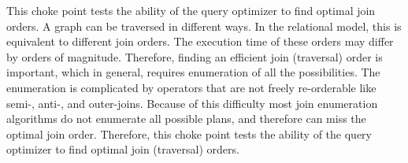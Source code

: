 
This choke point tests the ability of the query optimizer to find optimal join
orders. A graph can be traversed in different ways. In the relational model,
this is equivalent to different join orders. The execution time of these orders
may differ by orders of magnitude. Therefore, finding an efficient join
(traversal) order is important, which in general, requires enumeration of all
the possibilities. The enumeration is complicated by operators that are not
freely re-orderable like semi-, \mbox{anti-,} and outer-joins. Because of this
difficulty most join enumeration algorithms do not enumerate all possible plans,
and therefore can miss the optimal join order. Therefore, this choke point tests
the ability of the query optimizer to find optimal join (traversal) orders.


